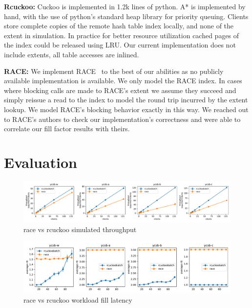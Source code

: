 \textbf{Rcuckoo:} Cuckoo is implemented in 1.2k lines of
python. A* is implemented by hand, with the use of python's
standard heap library for priority queuing. Clients store
complete copies of the remote hash table index locally, and
none of the extent in simulation. In practice for better
resource utilization cached pages of the index could be
released using LRU. Our current implementation does not
include extents, all table accesses are inlined.

\textbf{RACE:} We implement RACE~\cite{race} to the best of
our abilities as no publicly available implementation is
available. We only model the RACE index. In cases where
blocking calls are made to RACE's extent we assume they
succeed and simply reissue a read to the index to model the
round trip incurred by the extent lookup. We model RACE's
blocking behavior exactly in this way. We reached out to
RACE's authors to check our implementation's correctness and
were able to correlate our fill factor results with theirs.

\section{Evaluation}
\label{sec:eval}

\begin{figure}[ht]
    \includegraphics[width=0.99\linewidth]{fig/hero_ycsb_throughput.pdf}
    \caption{race vs rcuckoo simulated throughput}
    \label{fig:ycsb_throughput}
\end{figure}

\begin{figure}[ht]
    \includegraphics[width=0.99\linewidth]{fig/hero_ycsb_fill_latency.pdf}
    \caption{race vs rcuckoo workload fill latency}
    \label{fig:ycsb_fill_latency}
\end{figure}

